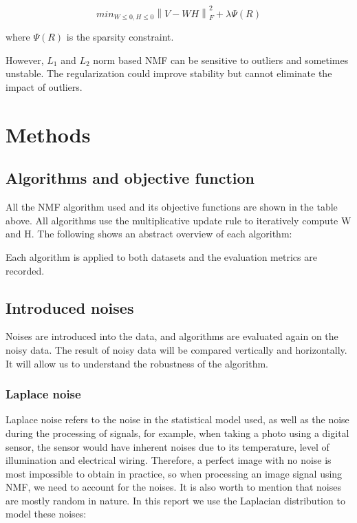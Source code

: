 \documentclass{article} %
\begin{document}
\begin{equation}
min_{W \leq 0, H \leq 0}\left \|V - WH\right \|_F^2 + \lambda\Psi\left(R\right)
\end{equation}

where $\Psi\left(R\right)$ is the sparsity constraint.

However, $L_1$ and $L_2$ norm based NMF can be sensitive to outliers and sometimes unstable. The regularization could improve stability but cannot eliminate the impact of outliers.

\section{Methods}
\subsection{Algorithms and objective function}
All the NMF algorithm used and its objective functions are shown in the table above. All algorithms use the multiplicative update rule to iteratively compute W and H. The following shows an abstract overview of each algorithm:

Each algorithm is applied to both datasets and the evaluation metrics are recorded.

\subsection{Introduced noises}
Noises are introduced into the data, and algorithms are evaluated again on the noisy data. The result of noisy data will be compared vertically and horizontally. It will allow us to understand the robustness of the algorithm.

\subsubsection{Laplace noise}
Laplace noise refers to the noise in the statistical model used, as well as the noise during the processing of signals, for example, when taking a photo using a digital sensor, the sensor would have inherent noises due to its temperature, level of illumination and electrical wiring. Therefore, a perfect image with no noise is most impossible to obtain in practice, so when processing an image signal using NMF, we need to account for the noises. It is also worth to mention that noises are mostly random in nature. In this report we use the Laplacian distribution to model these noises:
\end{document}
